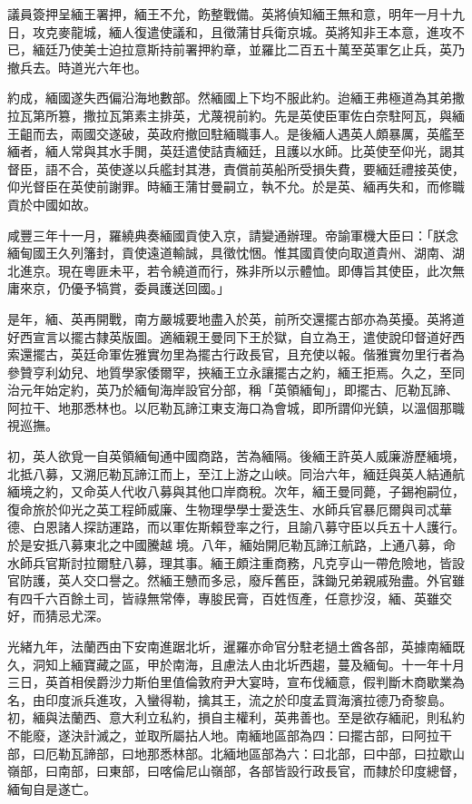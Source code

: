 \begin{pinyinscope}
議員簽押呈緬王署押，緬王不允，飭整戰備。英將偵知緬王無和意，明年一月十九日，攻克麥龍城，緬人復遣使議和，且徵蒲甘兵衛京城。英將知非王本意，進攻不已，緬廷乃使美士迫拉意斯持前署押約章，並羅比二百五十萬至英軍乞止兵，英乃撤兵去。時道光六年也。

約成，緬國遂失西偏沿海地數部。然緬國上下均不服此約。迨緬王弗極道為其弟撒拉瓦第所篡，撒拉瓦第素主排英，尤蔑視前約。先是英使臣軍佐白奈駐阿瓦，與緬王齟而去，兩國交遂破，英政府撤回駐緬職事人。是後緬人遇英人頗暴厲，英艦至緬者，緬人常與其水手閧，英廷遣使詰責緬廷，且護以水師。比英使至仰光，謁其督臣，語不合，英使遂以兵艦封其港，責償前英船所受損失費，要緬廷禮接英使，仰光督臣在英使前謝罪。時緬王蒲甘曼嗣立，執不允。於是英、緬再失和，而修職貢於中國如故。

咸豐三年十一月，羅繞典奏緬國貢使入京，請變通辦理。帝諭軍機大臣曰：「朕念緬甸國王久列籓封，貢使遠道輸誠，具徵忱悃。惟其國貢使向取道貴州、湖南、湖北進京。現在粵匪未平，若令繞道而行，殊非所以示體恤。即傳旨其使臣，此次無庸來京，仍優予犒賞，委員護送回國。」

是年，緬、英再開戰，南方嚴城要地盡入於英，前所交還擺古部亦為英擾。英將道好西宣言以擺古隸英版圖。適緬親王曼同下王於獄，自立為王，遣使說印督道好西索還擺古，英廷命軍佐雅實勿里為擺古行政長官，且充使以報。偕雅實勿里行者為參贊亨利幼兒、地質學家倭爾罕，挾緬王立永讓擺古之約，緬王拒焉。久之，至同治元年始定約，英乃於緬甸海岸設官分部，稱「英領緬甸」，即擺古、厄勒瓦諦、阿拉干、地那悉林也。以厄勒瓦諦江東支海口為會城，即所謂仰光鎮，以溫個那職視巡撫。

初，英人欲覓一自英領緬甸通中國商路，苦為緬隔。後緬王許英人威廉游歷緬境，北抵八募，又溯厄勒瓦諦江而上，至江上游之山峽。同治六年，緬廷與英人結通航緬境之約，又命英人代收八募與其他口岸商稅。次年，緬王曼同薨，子錫袍嗣位，復命旅於仰光之英工程師威廉、生物理學學士愛迭生、水師兵官暴厄爾與司忒華德、白恩諸人探訪運路，而以軍佐斯賴登率之行，且諭八募守臣以兵五十人護行。於是安抵八募東北之中國騰越境。八年，緬始開厄勒瓦諦江航路，上通八募，命水師兵官斯討拉爾駐八募，理其事。緬王頗注重商務，凡克亨山一帶危險地，皆設官防護，英人交口譽之。然緬王戇而多忌，廢斥舊臣，誅鋤兄弟親戚殆盡。外官雖有四千六百餘土司，皆祿無常俸，專朘民膏，百姓恆產，任意抄沒，緬、英雖交好，而猜忌尤深。

光緒九年，法蘭西由下安南進踞北圻，暹羅亦命官分駐老撾土酋各部，英據南緬既久，洞知上緬寶藏之區，甲於南海，且慮法人由北圻西趨，蔓及緬甸。十一年十月三日，英首相侯爵沙力斯伯里值倫敦府尹大宴時，宣布伐緬意，假判斷木商歇業為名，由印度派兵進攻，入蠻得勒，擒其王，流之於印度孟買海濱拉德乃奇黎島。初，緬與法蘭西、意大利立私約，損自主權利，英弗善也。至是欲存緬祀，則私約不能廢，遂決計滅之，並取所屬拈人地。南緬地區部為四：曰擺古部，曰阿拉干部，曰厄勒瓦諦部，曰地那悉林部。北緬地區部為六：曰北部，曰中部，曰拉歇山嶺部，曰南部，曰東部，曰喀倫尼山嶺部，各部皆設行政長官，而隸於印度總督，緬甸自是遂亡。


\end{pinyinscope}

